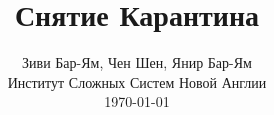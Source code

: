 \documentclass[onecolumn,journal]{IEEEtran}
\begin{document}
\title{\color{Brown} Снятие Карантина \\
\vspace{-0.35ex}}
\author{\large Зиви Бар-Ям, Чен Шен, Янир Бар-Ям \\ Институт Сложных Систем Новой Англии \\
 \today 
  \vspace{-10ex} \\ 

   
\bigskip
\bigskip

\textbf{}
 }
    
\maketitle


\flushbottom %



\thispagestyle{empty} %




\renewcommand{\thefootnote}{\fnsymbol{footnote}}
\end{document}
